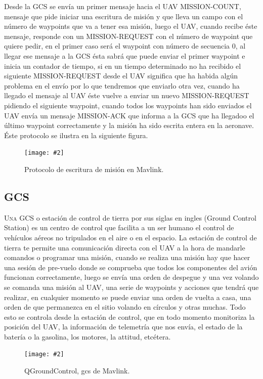 \documentclass[12pt,a4paper,spanish]{book} %
\newcommand{\imgCentrada}[3]{
\begin{figure}[H]
\begin{center}
\texttt{[image: \#2]}
\caption{#3}
\label{#1}
\end{center}
\end{figure}
}
\begin{document}
Desde la GCS se envía un primer mensaje hacia el UAV MISSION-COUNT, mensaje que pide iniciar una escritura de
misión y que lleva un campo con el número de waypoints que va a tener esa misión, luego el UAV, cuando recibe éste mensaje, responde con un MISSION-REQUEST con el número de waypoint que quiere pedir, en el primer caso será el waypoint con número de secuencia 0, al llegar ese mensaje a la GCS ésta sabrá que puede enviar el primer waypoint e inicia un contador de tiempo, si en un tiempo determinado no ha recibido el siguiente MISSION-REQUEST desde el UAV significa que ha habida algún problema en el envío por lo que tendremos que enviarlo otra vez, cuando ha llegado el mensaje al UAV éste vuelve a enviar un nuevo MISSION-REQUEST pidiendo el siguiente waypoint, cuando todos los waypoints han sido enviados el UAV envía un mensaje MISSION-ACK que informa a la GCS que ha llegadoo el último waypoint correctamente y la misión ha sido escrita entera en la aeronave. Éste protocolo se ilustra en la siguiente figura.

\imgCentrada{fig.2.23}{img/mavlinkwaypointwrite.eps}{Protocolo de escritura de misión en Mavlink.}

\newpage
\subsection{GCS}

\lettrine{U}{na} GCS o estación de control de tierra por sus siglas en ingles (Ground Control Station) es un centro de control que facilita a un ser humano el control de vehículos aéreos no tripulados en el aire o en el espacio. La estación de control de tierra te permite una comunicación directa con el UAV a la hora de mandarle comandos o programar una misión, cuando se realiza una misión hay que hacer una sesión de pre-vuelo donde se comprueba que todos los componentes del avión funcionan correctamente, luego se envía una orden de despegue y una vez volando se comanda una misión al UAV, una serie de waypoints y acciones que tendrá que realizar, en cualquier momento se puede enviar una orden de vuelta a casa, una orden de que permanezca en el sitio volando en círculos y otras muchas. Todo esto se controla desde la estación de control, que en todo momento monitoriza la posición del UAV, la información de telemetría que nos envía, el estado de la batería o la gasolina, los motores, la attitud, etcétera.

\imgCentrada{fig.2.24}{img/qgroundcontrol.eps}{QGroundControl, gcs de Mavlink.}
\end{document}
